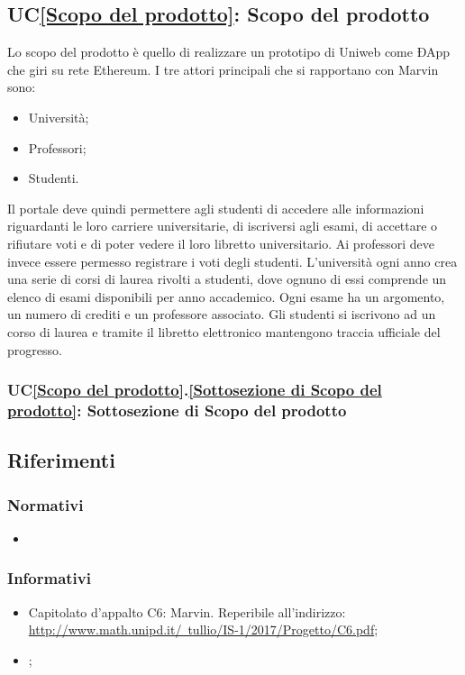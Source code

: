 \subsection{UC\ref{Scopo del prodotto}: Scopo del prodotto}
Lo scopo del prodotto è quello di realizzare un prototipo di Uniweb come ÐApp che giri su rete Ethereum. I tre attori principali che si rapportano con Marvin sono:
\begin{itemize}
	\item Università;
	\item Professori;
	\item Studenti.
\end{itemize} 
Il portale deve quindi permettere agli studenti di accedere alle informazioni riguardanti le loro carriere universitarie, di iscriversi agli esami, di accettare o rifiutare voti e di poter vedere il loro libretto universitario.
Ai professori deve invece essere permesso registrare i voti degli studenti.
L'università ogni anno crea una serie di corsi di laurea rivolti a studenti, dove ognuno di essi comprende un elenco di esami disponibili per anno accademico. Ogni esame ha un argomento, un numero di crediti e un professore associato. Gli studenti si iscrivono ad un corso di laurea e tramite il libretto elettronico mantengono traccia ufficiale del progresso.

\subsubsection{UC\ref{Scopo del prodotto}.\ref{Sottosezione di Scopo del prodotto}: Sottosezione di Scopo del prodotto}

\subsection{Riferimenti}
\subsubsection{Normativi}
\begin{itemize}
	\item \textcolor{red}\NdP
\end{itemize}

\subsubsection{Informativi}
\begin{itemize}
	\item Capitolato d'appalto C6: Marvin. Reperibile all'indirizzo:\\ 
	\href{http://www.math.unipd.it/~tullio/IS-1/2017/Progetto/C6.pdf}{http://www.math.unipd.it/~tullio/IS-1/2017/Progetto/C6.pdf};
	\item \textcolor{red}\SdF;
\end{itemize}
